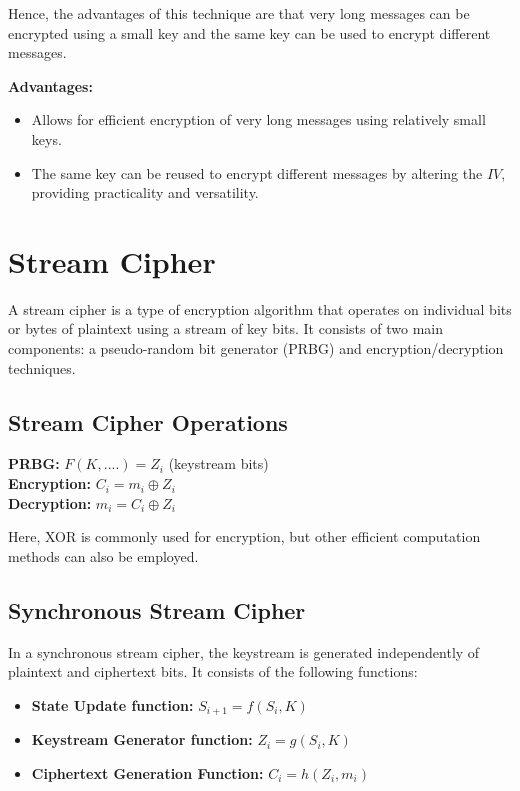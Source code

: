 \documentclass[11pt]{article}
\begin{document}
Hence, the advantages of this technique are that very long messages can be encrypted using a small key and the same key can be used to encrypt different messages.

\textbf{Advantages:}
\begin{itemize}
    \item Allows for efficient encryption of very long messages using relatively small keys.
    \item The same key can be reused to encrypt different messages by altering the \(IV\), providing practicality and versatility.
\end{itemize}


\section{Stream Cipher}

A stream cipher is a type of encryption algorithm that operates on individual bits or bytes of plaintext using a stream of key bits. It consists of two main components: a pseudo-random bit generator (PRBG) and encryption/decryption techniques.

\subsection{Stream Cipher Operations}

\textbf{PRBG:} \(F(K, ....) = Z_i\) (keystream bits) \\
\textbf{Encryption:} \(C_i = m_i \oplus Z_i\) \\
\textbf{Decryption:} \(m_i = C_i \oplus Z_i\)

Here, XOR is commonly used for encryption, but other efficient computation methods can also be employed.

\subsection{Synchronous Stream Cipher}

In a synchronous stream cipher, the keystream is generated independently of plaintext and ciphertext bits. It consists of the following functions:

\begin{itemize}
    \item \textbf{State Update function:} \(S_{i+1} = f(S_i, K)\)
    \item \textbf{Keystream Generator function:} \(Z_i = g(S_i, K)\)
    \item \textbf{Ciphertext Generation Function:} \(C_i = h(Z_i, m_i)\)
\end{itemize}
\end{document}
